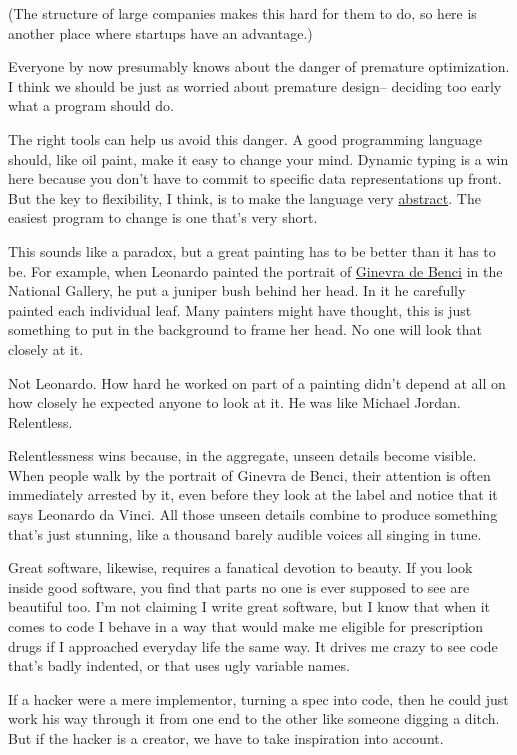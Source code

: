 \documentclass[12pt]{book}
\begin{document}
(The structure of large companies makes this hard for them to do, so
here is another place where startups have an advantage.)

Everyone by now presumably knows about the danger of premature
optimization. I think we should be just as worried about premature
design-- deciding too early what a program should do.

The right tools can help us avoid this danger. A good programming
language should, like oil paint, make it easy to change your mind.
Dynamic typing is a win here because you don't have to commit to
specific data representations up front. But the key to flexibility, I
think, is to make the language very \href{power.html}{abstract}. The
easiest program to change is one that's very short.

This sounds like a paradox, but a great painting has to be better than
it has to be. For example, when Leonardo painted the portrait of
\href{ginevra.html}{Ginevra de Benci} in the National Gallery, he put a
juniper bush behind her head. In it he carefully painted each individual
leaf. Many painters might have thought, this is just something to put in
the background to frame her head. No one will look that closely at it.

Not Leonardo. How hard he worked on part of a painting didn't depend at
all on how closely he expected anyone to look at it. He was like Michael
Jordan. Relentless.

Relentlessness wins because, in the aggregate, unseen details become
visible. When people walk by the portrait of Ginevra de Benci, their
attention is often immediately arrested by it, even before they look at
the label and notice that it says Leonardo da Vinci. All those unseen
details combine to produce something that's just stunning, like a
thousand barely audible voices all singing in tune.

Great software, likewise, requires a fanatical devotion to beauty. If
you look inside good software, you find that parts no one is ever
supposed to see are beautiful too. I'm not claiming I write great
software, but I know that when it comes to code I behave in a way that
would make me eligible for prescription drugs if I approached everyday
life the same way. It drives me crazy to see code that's badly indented,
or that uses ugly variable names.

If a hacker were a mere implementor, turning a spec into code, then he
could just work his way through it from one end to the other like
someone digging a ditch. But if the hacker is a creator, we have to take
inspiration into account.
\end{document}
